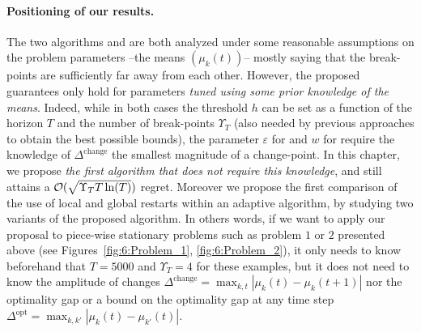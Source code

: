 \paragraph{Positioning of our results.}
%
The two algorithms \CUSUMUCB{} and \MUCB{} are both analyzed under some reasonable assumptions on the problem parameters --the means $(\mu_k(t))$-- mostly saying that the break-points are sufficiently far away from each other.
%
However, the proposed guarantees only hold for parameters \emph{tuned using some prior knowledge of the means}.
Indeed, while in both cases the threshold $h$ can be set as a function of the horizon $T$ and the number of break-points  $\Upsilon_T$ (also needed by previous approaches to obtain the best possible bounds), the parameter $\varepsilon$ for \CUSUM{} and $w$ for \MUCB{} require the knowledge of $\Delta^{\text{change}}$ the smallest magnitude of a change-point.
%
In this chapter, we propose \emph{the first algorithm that does not require this knowledge}, and still attains a $\mathcal{O}(\sqrt{\Upsilon_T T\ln(T)})$ regret.
Moreover we propose the first comparison of the use of local and global restarts within an adaptive algorithm, by studying two variants of the proposed algorithm.
%
In others words, if we want to apply our proposal to piece-wise stationary problems such as problem $1$ or $2$ presented above (see Figures~\ref{fig:6:Problem_1}, \ref{fig:6:Problem_2}),
it only needs to know beforehand that $T=5000$ and $\Upsilon_T=4$ for these examples, but it does not need to know the amplitude of changes $\Delta^{\text{change}} = \max_{k,t} |\mu_k(t) - \mu_k(t+1)|$ nor the optimality gap or a bound on the optimality gap at any time step $\Delta^{\text{opt}} = \max_{k,k'} |\mu_k(t) - \mu_{k'}(t)|$.

